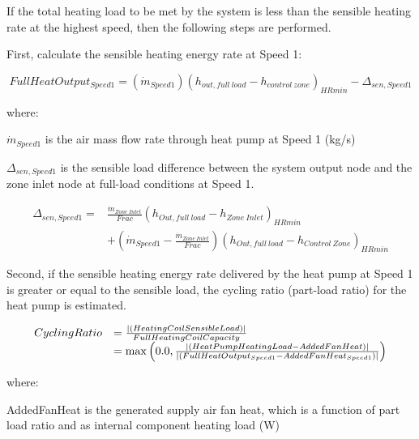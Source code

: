 If the total heating load to be met by the system is less than the sensible heating rate at the highest speed, then the following steps are performed.

First, calculate the sensible heating energy rate at Speed 1:

\begin{equation}
FullHeatOutpu{t_{Speed1}} = \left( {{{\dot m}_{Speed1}}} \right){\left( {{h_{out,full~load}} - {h_{control~zone}}} \right)_{HRmin}} - {\Delta_{sen,Speed1}}
\end{equation}

where:

\({{{\dot m}_{Speed1}}}\) is the air mass flow rate through heat pump at Speed 1 (kg/s)

\(\Delta_{sen,Speed1}\) is the sensible load difference between the system output node and the zone inlet node at full-load conditions at Speed 1.

\begin{equation}
\begin{array}{rl}
{\Delta_{sen,Speed1}} =& \frac{{{{\dot m}_{Zone~Inlet}}}}{{Frac}}{\left( {{h_{Out,full~load}} - {h_{Zone~Inlet}}} \right)_{HRmin}} \\
 & + \left( {{{\dot m}_{Speed1}} - \frac{{{{\dot m}_{Zone~Inlet}}}}{{Frac}}} \right){\left( {{h_{Out,full~load}} - {h_{Control~Zone}}} \right)_{HRmin}}
\end{array}
\end{equation}

Second, if the sensible heating energy rate delivered by the heat pump at Speed 1 is greater or equal to the sensible load, the cycling ratio (part-load ratio) for the heat pump is estimated.

\begin{equation}
  \begin{array}{rl}
    CyclingRatio &= \frac{\left|\left(HeatingCoilSensibleLoad\right)\right|}{FullHeatingCoilCapacity} \\
                 &= \max \left(0.0, \frac{\left|\left(HeatPumpHeatingLoad-AddedFanHeat\right)\right|}{\left|\left(FullHeatOutput_{Speed1}-AddedFanHeat_{Speed1}\right)\right|} \right)
  \end{array}
\label{eq:UnitaryMultiSpeedCyclingRatioHeating}
\end{equation}

where:

AddedFanHeat is the generated supply air fan heat, which is a function of part load ratio and as internal component heating load (W)

